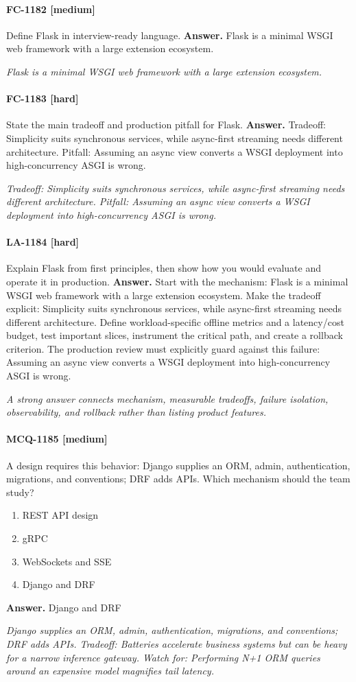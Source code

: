 \paragraph{FC-1182 [medium]} Define Flask in interview-ready language.
\noindent\textbf{Answer.} Flask is a minimal WSGI web framework with a large extension ecosystem.
\par\textit{Flask is a minimal WSGI web framework with a large extension ecosystem.}
\paragraph{FC-1183 [hard]} State the main tradeoff and production pitfall for Flask.
\noindent\textbf{Answer.} Tradeoff: Simplicity suits synchronous services, while async-first streaming needs different architecture. Pitfall: Assuming an async view converts a WSGI deployment into high-concurrency ASGI is wrong.
\par\textit{Tradeoff: Simplicity suits synchronous services, while async-first streaming needs different architecture. Pitfall: Assuming an async view converts a WSGI deployment into high-concurrency ASGI is wrong.}
\paragraph{LA-1184 [hard]} Explain Flask from first principles, then show how you would evaluate and operate it in production.
\noindent\textbf{Answer.} Start with the mechanism: Flask is a minimal WSGI web framework with a large extension ecosystem. Make the tradeoff explicit: Simplicity suits synchronous services, while async-first streaming needs different architecture. Define workload-specific offline metrics and a latency/cost budget, test important slices, instrument the critical path, and create a rollback criterion. The production review must explicitly guard against this failure: Assuming an async view converts a WSGI deployment into high-concurrency ASGI is wrong.
\par\textit{A strong answer connects mechanism, measurable tradeoffs, failure isolation, observability, and rollback rather than listing product features.}
\paragraph{MCQ-1185 [medium]} A design requires this behavior: Django supplies an ORM, admin, authentication, migrations, and conventions; DRF adds APIs. Which mechanism should the team study?
\begin{enumerate}[label=\Alph*.]
\item REST API design
\item gRPC
\item WebSockets and SSE
\item Django and DRF
\end{enumerate}
\noindent\textbf{Answer.} Django and DRF
\par\textit{Django supplies an ORM, admin, authentication, migrations, and conventions; DRF adds APIs. Tradeoff: Batteries accelerate business systems but can be heavy for a narrow inference gateway. Watch for: Performing N+1 ORM queries around an expensive model magnifies tail latency.}
